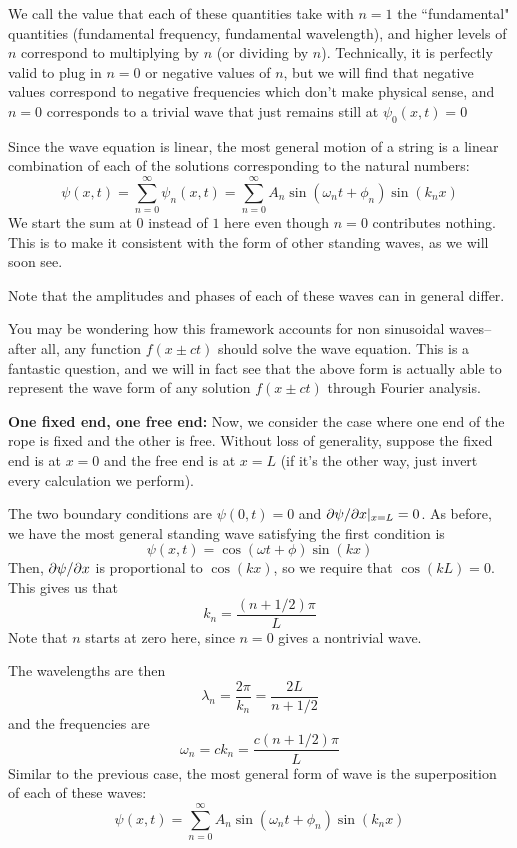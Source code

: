 We call the value that each of these quantities take with $n=1$ the ``fundamental" quantities (fundamental frequency, fundamental wavelength), and higher levels of $n$ correspond to multiplying by $n$ (or dividing by $n$). Technically, it is perfectly valid to plug in $n=0$ or negative values of $n$, but we will find that negative values correspond to negative frequencies which don't make physical sense, and $n=0$ corresponds to a trivial wave that just remains still at $\psi_0(x,t) = 0$

Since the wave equation is linear, the most general motion of a string is a linear combination of each of the solutions corresponding to the natural numbers:
\[ \psi(x,t) = \sum_{n=0}^\infty \psi_n(x,t) = \sum_{n=0}^\infty A_n\sin(\omega_n t+\phi_n)\sin(k_nx) \]
We start the sum at $0$ instead of $1$ here even though $n=0$ contributes nothing. This is to make it consistent with the form of other standing waves, as we will soon see.

Note that the amplitudes and phases of each of these waves can in general differ.

You may be wondering how this framework accounts for non sinusoidal waves--after all, any function $f(x\pm ct)$ should solve the wave equation. This is a fantastic question, and we will in fact see that the above form is actually able to represent the wave form of any solution $f(x\pm ct)$ through Fourier analysis. 

\textbf{One fixed end, one free end:} Now, we consider the case where one end of the rope is fixed and the other is free. Without loss of generality, suppose the fixed end is at $x=0$ and the free end is at $x=L$ (if it's the other way, just invert every calculation we perform). 

The two boundary conditions are $\psi(0, t) = 0$ and $\partial \psi/\partial x|_{x=L} = 0$. As before, we have the most general standing wave satisfying the first condition is
\[ \psi(x,t) = \cos(\omega t+\phi)\sin(kx) \]
Then, $\partial \psi/\partial x$ is proportional to $\cos(kx)$, so we require that $\cos(kL) = 0$. This gives us that
\[ k_n = \frac{(n+1/2)\pi}{L} \]
Note that $n$ starts at zero here, since $n=0$ gives a nontrivial wave. 

The wavelengths are then
\[ \lambda_n = \frac{2\pi}{k_n} = \frac{2L}{n+1/2}\]
and the frequencies are
\[ \omega_n = ck_n = \frac{c(n+1/2)\pi}{L} \]
Similar to the previous case, the most general form of wave is the superposition of each of these waves:
\[ \psi(x,t) = \sum_{n=0}^\infty A_n \sin(\omega_n t+\phi_n)\sin(k_nx) \]

